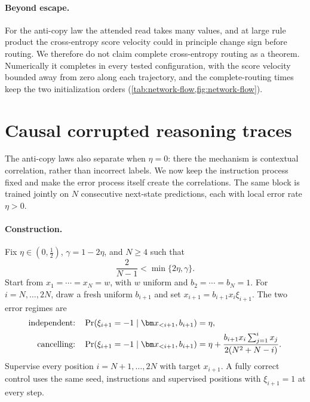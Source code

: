 \paragraph{Beyond escape.}
For the anti-copy law the attended read takes many values, and at large rule product the cross-entropy score velocity
could in principle change sign before routing. We therefore do not claim complete cross-entropy routing as a theorem.
Numerically it completes in every tested configuration, with the score velocity bounded away from zero along each trajectory,
and the complete-routing times keep the two initialization orders (\cref{tab:network-flow,fig:network-flow}).

\section{Causal corrupted reasoning traces}
\label{sec:causal}
The anti-copy laws also separate when $\eta=0$: there the mechanism is contextual correlation, rather than incorrect labels.
We now keep the instruction process fixed and make the error process itself create the correlations.
The same block is trained jointly on $N$ consecutive next-state predictions, each with local error rate $\eta>0$.

\paragraph{Construction.}
Fix $\eta\in(0,\tfrac{1}{2})$, $\gamma=1-2\eta$, and $N\ge4$ such that
\[
 \frac{2}{N-1}<\min\{2\eta,\gamma\}.
\]
Start from $x_1=\cdots=x_N=w$, with $w$ uniform and $b_2=\cdots=b_N=1$.
For $i=N,\ldots,2N$, draw a fresh uniform $b_{i+1}$ and set $x_{i+1}=b_{i+1}x_i \xi_{i+1}$.
The two error regimes are
\begin{align}
 \text{independent:}\quad&\Pr(\xi_{i+1}=-1\mid\bm x_{<i+1},b_{i+1})=\eta,\notag\\
 \text{cancelling:}\quad&\Pr(\xi_{i+1}=-1\mid\bm x_{<i+1},b_{i+1})
 =\eta+\frac{b_{i+1}x_i\sum_{j=1}^i x_j}{2(N^2+N-i)}.
 \label{eq:causal-kernel}
\end{align}
Supervise every position $i=N+1,\ldots,2N$ with target $x_{i+1}$.
A fully correct control uses the same seed, instructions and supervised positions with $\xi_{i+1}=1$ at every step.

